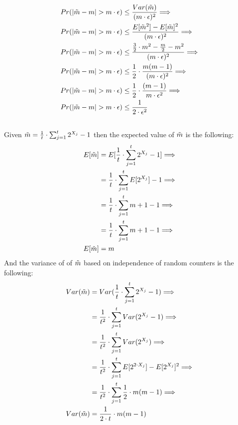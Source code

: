 \documentclass[11pt]{537homework}
\begin{document}
\begin{align*}
  Pr(| \Tilde{m} - m | &> m\cdot \epsilon) \leq \frac{Var(\Tilde{m})}{(m\cdot \epsilon)^2}\Longrightarrow \\
  Pr(| \Tilde{m} - m | &> m\cdot \epsilon) \leq \frac{E[\Tilde{m}^2] - E[\Tilde{m}]^2}{(m\cdot \epsilon)^2}\Longrightarrow \\
  Pr(| \Tilde{m} - m | &> m\cdot \epsilon) \leq \frac{\frac{3}{2}\cdot m^2 - \frac{m}{2} - m^2}{(m\cdot \epsilon)^2}\Longrightarrow \\
  Pr(| \Tilde{m} - m | &> m\cdot \epsilon) \leq \frac{1}{2} \cdot \frac{m(m - 1)}{(m\cdot \epsilon)^2}\Longrightarrow \\
  Pr(| \Tilde{m} - m | &> m\cdot \epsilon) \leq \frac{1}{2} \cdot \frac{(m - 1)}{m \cdot \epsilon^2}\Longrightarrow \\
  Pr(| \Tilde{m} - m | &> m\cdot \epsilon) \leq \frac{1}{2 \cdot \epsilon^2}
\end{align*}
\subsection{}
Given $ \Tilde{m} = \frac{1}{t} \cdot \sum_{j=1}^{t} 2^{X_j} -1$ then the expected value of $\Tilde{m}$ is the following:
\allowdisplaybreaks
\begin{align*}
  E[\Tilde{m}] &= E[\frac{1}{t} \cdot \sum_{j=1}^{t} 2^{X_j} -1] \Longrightarrow \\
               &= \frac{1}{t} \cdot \sum_{j=1}^{t} E[2^{X_j}] -1 \Longrightarrow \\
               &= \frac{1}{t} \cdot \sum_{j=1}^{t} m+1 -1 \Longrightarrow \\
               &= \frac{1}{t} \cdot \sum_{j=1}^{t} m+1 -1 \Longrightarrow \\
  E[\Tilde{m}] &= m
\end{align*}
And the variance of of $\Tilde{m}$ based on independence of random counters is the following:
\allowdisplaybreaks
\begin{align*}
  Var(\Tilde{m}) &= Var(\frac{1}{t} \cdot \sum_{j=1}^{t} 2^{X_j} -1) \Longrightarrow \\
               &= \frac{1}{t^2} \cdot \sum_{j=1}^{t} Var(2^{X_j} -1) \Longrightarrow \\
               &= \frac{1}{t^2} \cdot \sum_{j=1}^{t} Var(2^{X_j})  \Longrightarrow \\
               &= \frac{1}{t^2} \cdot \sum_{j=1}^{t} E[2^{2\cdot X_j}] - E[2^{X_j}]^2   \Longrightarrow \\
               &= \frac{1}{t^2} \cdot \sum_{j=1}^{t} \frac{1}{2} \cdot m(m - 1) \Longrightarrow \\
Var(\Tilde{m}) &= \frac{1}{2\cdot t} \cdot m(m - 1)
\end{align*}
\end{document}
